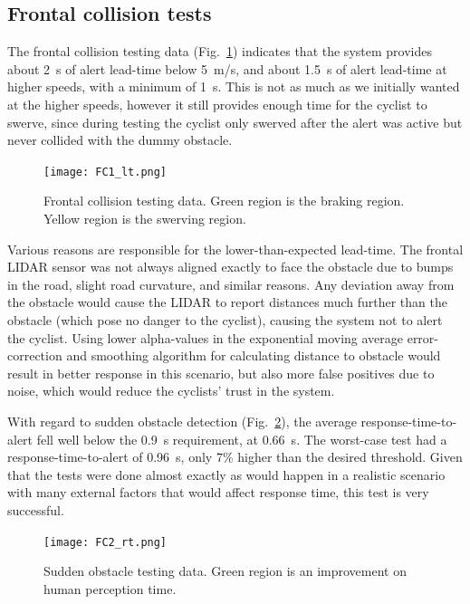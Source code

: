 \documentclass[journal]{IEEEtran}
\begin{document}
\subsection{Frontal collision tests}
The frontal collision testing data (Fig.~\ref{fig:fc1}) indicates that the system provides about \SI{2}{\s} of alert lead-time below \SI{5}{\meter/\s}, and about \SI{1.5}{\s} of alert lead-time at higher speeds, with a minimum of \SI{1}{\s}. This is not as much as we initially wanted at the higher speeds, however it still provides enough time for the cyclist to swerve, since during testing the cyclist only swerved after the alert was active but never collided with the dummy obstacle.

\begin{figure}
    \centering
    \texttt{[image: FC1\_lt.png]}
    \caption{Frontal collision testing data. Green region is the braking region. Yellow region is the swerving region.}
    \label{fig:fc1}
\end{figure}

Various reasons are responsible for the lower-than-expected lead-time. The frontal LIDAR sensor was not always aligned exactly to face the obstacle due to bumps in the road, slight road curvature, and similar reasons. Any deviation away from the obstacle would cause the LIDAR to report distances much further than the obstacle (which pose no danger to the cyclist), causing the system not to alert the cyclist. Using lower alpha-values in the exponential moving average error-correction and smoothing algorithm for calculating distance to obstacle would result in better response in this scenario, but also more false positives due to noise, which would reduce the cyclists' trust in the system.

With regard to sudden obstacle detection (Fig.~\ref{fig:fc2}), the average response-time-to-alert fell well below the \SI{0.9}{\s} requirement, at \SI{0.66}{\s}. The worst-case test had a response-time-to-alert of \SI{0.96}{\s}, only 7\% higher than the desired threshold. Given that the tests were done almost exactly as would happen in a realistic scenario with many external factors that would affect response time, this test is very successful.

\begin{figure}
    \centering
    \texttt{[image: FC2\_rt.png]}
    \caption{Sudden obstacle testing data. Green region is an improvement on human perception time.}
    \label{fig:fc2}
\end{figure}
\end{document}
